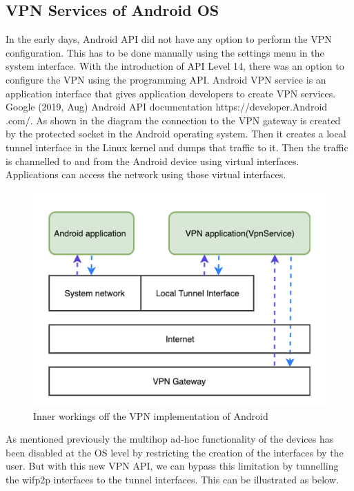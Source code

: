 \subsection{VPN Services of Android  OS}
\vspace{12pt}
In the early days, Android  API did not have any option to perform the VPN configuration. This has to be done manually using the settings menu in the system interface. With the introduction of API Level 14, there was an option to configure the VPN using the programming API. Android  VPN service is an application interface that gives application developers to create VPN services. Google (2019, Aug) Android  API documentation https://developer.Android .com/\cite{VPNAndroid}.
\vspace{12pt}
As shown in the diagram the connection to the VPN gateway is created by the protected socket in the Android operating system. Then it creates a local tunnel interface in the Linux kernel and dumps that traffic to it. Then the traffic is channelled to and from the  Android device using virtual interfaces. Applications can access the network using those virtual interfaces.
\vspace{12pt}

\begin{figure}[H]
    \centering
   \includegraphics[scale=0.5]{images/android_vpn_api_inner_workings}
    \caption{Inner workings off the VPN implementation of Android}
    \label{fig:timeline}
\end{figure}

\vspace{12pt}
As mentioned previously the multihop ad-hoc functionality of the devices has been disabled at the OS level by restricting the creation of the interfaces by the user. But with this new VPN API, we can bypass this limitation by tunnelling the wifp2p interfaces to the tunnel interfaces. This can be illustrated as below.
\vspace{12pt}


